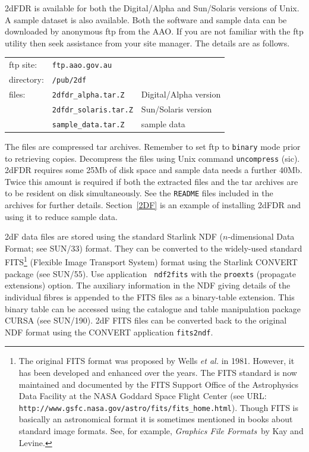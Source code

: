 \documentclass[twoside,11pt]{article}
\newcommand{\htmladdnormallink}[2]{#1}
\newcommand{\xref}[3]{#1}
\begin{document}
2dFDR is available for both the Digital/Alpha and Sun/Solaris versions
of Unix.  A sample dataset is also available.  Both the software and
sample data can be downloaded by anonymous ftp from the AAO.  If you are
not familiar with the ftp utility then seek assistance from your site
manager.  The details are as follows.

\begin{tabular}{lll}
ftp site:  & {\tt ftp.aao.gov.au}       & \\
directory: & {\tt /pub/2df}             & \\
files:     & {\tt 2dfdr\_alpha.tar.Z}   & Digital/Alpha version \\
           & {\tt 2dfdr\_solaris.tar.Z} & Sun/Solaris version   \\
           & {\tt sample\_data.tar.Z}   & sample data           \\
\end{tabular}

The files are compressed tar archives.  Remember to set ftp to {\tt binary}
mode prior to retrieving copies.  Decompress the files using Unix command
{\tt uncompress} (sic).  2dFDR requires some 25Mb of disk space and
sample data needs a further 40Mb.  Twice this amount is required if
both the extracted files and the tar archives are to be resident on
disk simultaneously.  See the {\tt README} files included in the archives
for further details.  Section~\ref{2DF} is an example of installing 2dFDR
and using it to reduce sample data.

2dF data files are stored using the standard Starlink NDF ($n$-dimensional
Data Format; see \xref{SUN/33}{sun33}{}\cite{SUN33}) format.  They
can be converted to the widely-used standard FITS\footnote{The
original FITS format was proposed by Wells {\it et al.}\/\cite{WELLS81}
in 1981.  However, it has been developed and enhanced over the years.
The FITS standard is now maintained and documented by the FITS Support
Office of the Astrophysics Data Facility at the NASA Goddard Space
Flight Center (see URL: \htmladdnormallink{ {\tt
http://www.gsfc.nasa.gov/astro/fits/fits\_home.html}}
{http://www.gsfc.nasa.gov/astro/fits/fits\_home.html}).
Though FITS is basically an astronomical format it is sometimes
mentioned in books about standard image formats.  See, for example,
{\it Graphics File Formats}\, by Kay and Levine\cite{KAY95}.}
(Flexible Image Transport System) format using the Starlink CONVERT
package (see \xref{SUN/55}{sun55}{}\cite{SUN55}).  Use application {\tt
ndf2fits} with the {\tt proexts} (propagate extensions) option.  The
auxiliary information in the NDF giving details of the individual
fibres is appended to the FITS files as a binary-table extension.  This
binary table can be accessed using the catalogue and table manipulation
package CURSA (see \xref{SUN/190}{sun190}{}\cite{SUN190}).  2dF FITS files
can be converted back to the original NDF format using the CONVERT
application {\tt fits2ndf}.
\end{document}
